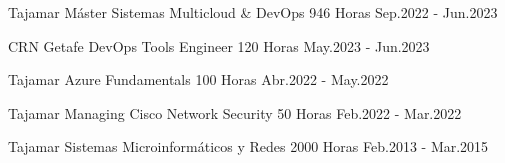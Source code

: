 
\begin{cventries}

\educationitem
  {Tajamar} %
  {Máster Sistemas Multicloud \& DevOps} %
  {946 Horas} %
  {Sep.2022 - Jun.2023} %

\educationitem
  {CRN Getafe} %
  {DevOps Tools Engineer} %
  {120 Horas} %
  {May.2023 - Jun.2023} %

\educationitem
  {Tajamar} %
  {Azure Fundamentals} %
  {100 Horas} %
  {Abr.2022 - May.2022} %

\educationitem
  {Tajamar} %
  {Managing Cisco Network Security} %
  {50 Horas} %
  {Feb.2022 - Mar.2022} %

\educationitem
  {Tajamar} %
  {Sistemas Microinformáticos y Redes} %
  {2000 Horas} %
  {Feb.2013 - Mar.2015} %

\end{cventries}
